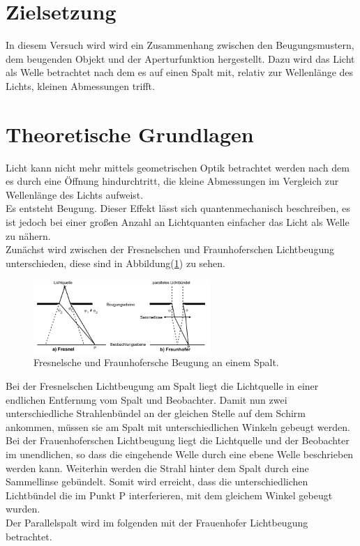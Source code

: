 \section{Zielsetzung}

    \noindent In diesem Versuch wird wird ein Zusammenhang zwischen den Beugungsmustern, dem beugenden Objekt und der Aperturfunktion hergestellt.
    Dazu wird das Licht als Welle betrachtet nach dem es auf einen Spalt mit, relativ zur Wellenlänge des Lichts, kleinen Abmessungen trifft.

\section{Theoretische Grundlagen}

    \noindent Licht kann nicht mehr mittels geometrischen Optik betrachtet werden nach dem es durch eine Öffnung hindurchtritt, die kleine 
    Abmessungen im Vergleich zur Wellenlänge des Lichts aufweist.\\ Es entsteht Beugung. Dieser Effekt lässt sich quantenmechanisch beschreiben, 
    es ist jedoch bei einer großen Anzahl an Lichtquanten einfacher das Licht als Welle zu nähern.\\

    \noindent Zunächst wird zwischen der Fresnelschen und Fraunhoferschen Lichtbeugung unterschieden, diese  sind in Abbildung(\ref{img:fresnel}) 
    zu sehen. 

    \begin{figure}[ht]
        \centering
        \includegraphics[width=0.6\textwidth]{latex/images/fresnel.PNG}
        \caption{Fresnelsche und Fraunhofersche Beugung an einem Spalt\protect \cite{V406}.}
        \label{img:fresnel}
    \end{figure}

    \noindent Bei der Fresnelschen Lichtbeugung am Spalt liegt die Lichtquelle in einer endlichen Entfernung vom Spalt und Beobachter. 
    Damit nun zwei unterschiedliche Strahlenbündel an der gleichen Stelle auf dem Schirm ankommen, müssen sie am Spalt mit unterschiedlichen 
    Winkeln gebeugt werden.\\ Bei der Frauenhoferschen Lichtbeugung liegt die Lichtquelle und der Beobachter im unendlichen, so dass die eingehende Welle durch 
    eine ebene Welle beschrieben werden kann. Weiterhin werden die Strahl hinter dem Spalt durch eine Sammellinse gebündelt. Somit wird 
    erreicht, dass die unterschiedlichen Lichtbündel die im Punkt P interferieren, mit dem gleichem Winkel gebeugt wurden.\\ Der Parallelspalt 
    wird im folgenden mit der Frauenhofer Lichtbeugung betrachtet.

